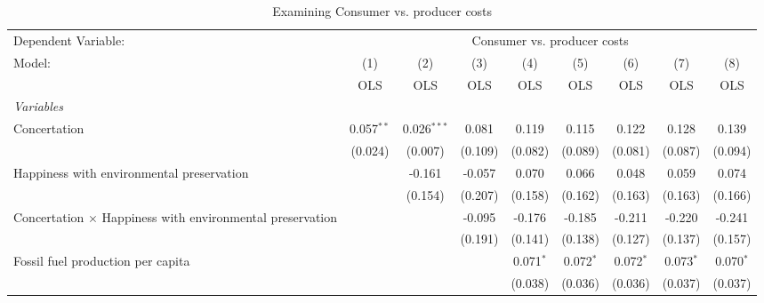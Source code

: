 
\begin{table}[htbp]
   \caption{Examining Consumer vs. producer costs}
   \centering
   \begin{tabular}{lcccccccc}
      \toprule
      Dependent Variable: & \multicolumn{8}{c}{Consumer vs. producer costs}\\
      Model:                                                           & (1)          & (2)           & (3)     & (4)         & (5)         & (6)         & (7)          & (8)\\  
                                                                       &  OLS         & OLS           & OLS     & OLS         & OLS         & OLS         & OLS          & OLS\\  
      \midrule
      \emph{Variables}\\
      Concertation                                                     & 0.057$^{**}$ & 0.026$^{***}$ & 0.081   & 0.119       & 0.115       & 0.122       & 0.128        & 0.139\\   
                                                                       & (0.024)      & (0.007)       & (0.109) & (0.082)     & (0.089)     & (0.081)     & (0.087)      & (0.094)\\   
      Happiness with environmental preservation                        &              & -0.161        & -0.057  & 0.070       & 0.066       & 0.048       & 0.059        & 0.074\\   
                                                                       &              & (0.154)       & (0.207) & (0.158)     & (0.162)     & (0.163)     & (0.163)      & (0.166)\\   
      Concertation $\times$ Happiness with environmental preservation  &              &               & -0.095  & -0.176      & -0.185      & -0.211      & -0.220       & -0.241\\   
                                                                       &              &               & (0.191) & (0.141)     & (0.138)     & (0.127)     & (0.137)      & (0.157)\\   
      Fossil fuel production per capita                                &              &               &         & 0.071$^{*}$ & 0.072$^{*}$ & 0.072$^{*}$ & 0.073$^{*}$  & 0.070$^{*}$\\   
                                                                       &              &               &         & (0.038)     & (0.036)     & (0.036)     & (0.037)      & (0.037)\\   

\end{tabular}
\end{table}
